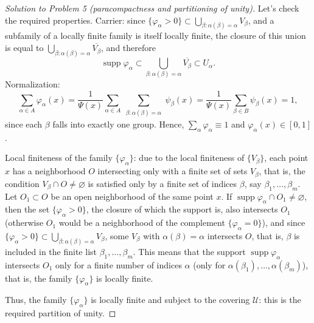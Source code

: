 \documentclass[a4paper,12pt]{report}
\begin{document}
\begin{proof}[Solution to Problem \textup{5} \textup{(}paracompactness and partitioning of unity\textup{)}]
Let's check the required properties. Carrier: since $\{\varphi_\alpha>0\}\subset\bigcup_{\beta\colon\alpha(\beta)=\alpha}V_\beta$, and a subfamily of a locally finite family is itself locally finite, the closure of this union is equal to $\bigcup_{\beta\colon\alpha(\beta)=\alpha}\overline{V_\beta}$, and therefore
\[
\operatorname{supp}\varphi_\alpha\subset\bigcup_{\beta\colon\alpha(\beta)=\alpha}\overline{V_\beta}\subset U_\alpha .
\]
Normalization:
\[
\sum_{\alpha\in A}\varphi_\alpha(x)=\frac{1}{\Psi(x)}\sum_{\alpha\in A}\sum_{\substack{\beta\colon\alpha(\beta)=\alpha}}\psi_\beta(x)=\frac{1}{\Psi(x)}\sum_{\beta\in B}\psi_\beta(x)=1 ,
\]
since each $\beta$ falls into exactly one group. Hence, $\sum_\alpha\varphi_\alpha\equiv1$ and $\varphi_\alpha(x)\in[0,1]$.

Local finiteness of the family $\{\varphi_\alpha\}$: due to the local finiteness of $\{V_\beta\}$, each point $x$ has a neighborhood $O$ intersecting only with a finite set of sets $V_\beta$, that is, the condition $V_\beta\cap O\ne\varnothing$ is satisfied only by a finite set of indices $\beta$, say $\beta_1,\dots,\beta_m$. Let $O_1\subset O$ be an open neighborhood of the same point $x$. If $\operatorname{supp}\varphi_\alpha\cap O_1\ne\varnothing$, then the set $\{\varphi_\alpha>0\}$, the closure of which the support is, also intersects $O_1$ \textup{(}otherwise $O_1$ would be a neighborhood of the complement $\{\varphi_\alpha=0\}$\textup{)}, and since $\{\varphi_\alpha>0\}\subset\bigcup_{\beta\colon\alpha(\beta)=\alpha}V_\beta$, some $V_\beta$ with $\alpha(\beta)=\alpha$ intersects $O$, that is, $\beta$ is included in the finite list $\beta_1,\dots,\beta_m$. This means that the support $\operatorname{supp}\varphi_\alpha$ intersects $O_1$ only for a finite number of indices $\alpha$ \textup{(}only for $\alpha(\beta_1),\dots,\alpha(\beta_m)$\textup{)}, that is, the family $\{\varphi_\alpha\}$ is locally finite.

Thus, the family $\{\varphi_\alpha\}$ is locally finite and subject to the covering $\mathcal U$: this is the required partition of unity.


\end{proof}
\end{document}
